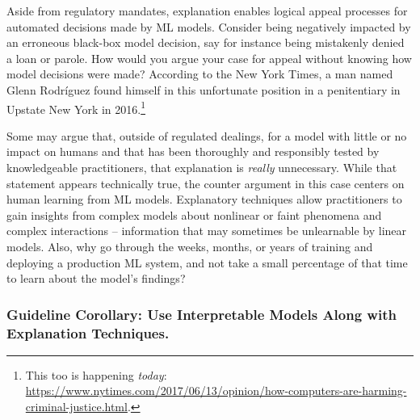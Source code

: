 \documentclass{article}
\begin{document}
Aside from regulatory mandates, explanation enables logical appeal processes for automated decisions made by ML models. Consider being negatively impacted by an erroneous black-box model decision, say for instance being mistakenly denied a loan or parole. How would you argue your case for appeal without knowing how model decisions were made? According to the New York Times, a man named Glenn Rodr\'iguez found himself in this unfortunate position in a penitentiary in Upstate New York in 2016.\footnote{This too is happening \textit{today}: \url{https://www.nytimes.com/2017/06/13/opinion/how-computers-are-harming-criminal-justice.html}.}

Some may argue that, outside of regulated dealings, for a model with little or no impact on humans and that has been thoroughly and responsibly tested by knowledgeable practitioners, that explanation is \textit{really} unnecessary. While that statement appears technically true, the counter argument in this case centers on human learning from ML models. Explanatory techniques allow practitioners to gain insights from complex models about nonlinear or faint phenomena and complex interactions -- information that may sometimes be unlearnable by linear models. Also, why go through the weeks, months, or years of training and deploying a production ML system, and not take a small percentage of that time to learn about the model's findings?

\subsubsection{Guideline Corollary: Use Interpretable Models Along with Explanation Techniques.}
\end{document}
